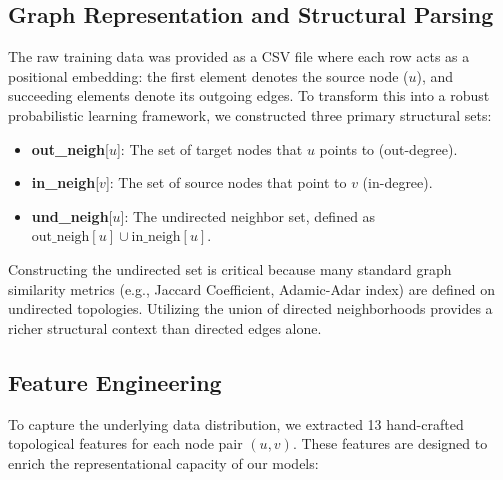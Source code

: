 \documentclass[11pt,a4paper]{article}
\begin{document}
\subsection{Graph Representation and Structural Parsing}
The raw training data was provided as a CSV file where each row acts as a positional embedding: the first element denotes the source node ($u$), and succeeding elements denote its outgoing edges. To transform this into a robust probabilistic learning framework, we constructed three primary structural sets:
\begin{itemize}[noitemsep]
    \item \textbf{out\_neigh}[$u$]: The set of target nodes that $u$ points to (out-degree).
    \item \textbf{in\_neigh}[$v$]: The set of source nodes that point to $v$ (in-degree).
    \item \textbf{und\_neigh}[$u$]: The undirected neighbor set, defined as $\text{out\_neigh}[u] \cup \text{in\_neigh}[u]$.
\end{itemize}
Constructing the undirected set is critical because many standard graph similarity metrics (e.g., Jaccard Coefficient, Adamic-Adar index) are defined on undirected topologies. Utilizing the union of directed neighborhoods provides a richer structural context than directed edges alone. 

\subsection{Feature Engineering}
To capture the underlying data distribution, we extracted 13 hand-crafted topological features for each node pair $(u, v)$. These features are designed to enrich the representational capacity of our models:
\end{document}
